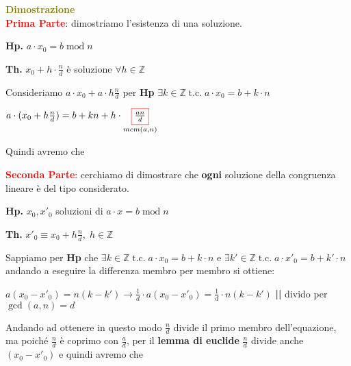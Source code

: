 \begin{boxA}
    \textcolor{olive}{\textbf{Dimostrazione}} \\
    \textcolor{red}{\textbf{Prima Parte}}: dimostriamo l'esistenza di una soluzione.

    {\centering
        \begin{minipage}[t]{0.45\textwidth}
            \centering
            \textbf{Hp.} $a \cdot x_0 = b \; \text{mod} \; n$
        \end{minipage}
        \begin{minipage}[t]{0.45\textwidth}
            \centering
            \textbf{Th.} $x_0 + h \cdot \frac{n}{d}$ è soluzione $\forall h \in \mathbb{Z}$
        \end{minipage}
    \par}
    Consideriamo $a \cdot x_0 + a \cdot h \frac{n}{d}$ per \textbf{Hp} $\exists k \in \mathbb{Z} \; \text{t.c.} \; a \cdot x_0 = b + k \cdot n$

    {\centering
    $a \cdot (x_0 + h \frac{n}{d}) = b + kn + h \cdot \underset{mcm(a, n)}{\fcolorbox{red}{white}{$\frac{an}{d}$}}$
    \par}
    Quindi avremo che 

    \textcolor{red}{\textbf{Seconda Parte}}: cerchiamo di dimostrare che \textbf{ogni} soluzione della congruenza lineare è del tipo considerato.

    {\centering
        \begin{minipage}[t]{0.45\textwidth}
            \centering
            \textbf{Hp.} $x_0, x'_0$ soluzioni di $a \cdot x = b \; \text{mod} \; n$
        \end{minipage}
        \begin{minipage}[t]{0.45\textwidth}
            \centering
            \textbf{Th.} $x'_0 \equiv x_0 + h \frac{n}{d}, \; h \in \mathbb{Z}$
        \end{minipage}
    \par}
    Sappiamo per \textbf{Hp} che $\exists k \in \mathbb{Z} \; \text{t.c.} \; a \cdot x_0 = b + k \cdot n$ e $\exists k' \in \mathbb{Z} \; \text{t.c.} \; a \cdot x'_0 = b + k' \cdot n$ andando a eseguire la differenza membro per membro si ottiene: 

    {\centering
        $a (x_0 - x'_0) = n (k - k') \rightarrow \frac{1}{d} \cdot a (x_0 - x'_0) = \frac{1}{d} \cdot n (k - k') $ \textbf{||} divido per $\gcd (a, n) = d$
    \par}
    Andando ad ottenere  in questo modo $\frac{n}{d}$ divide il primo membro dell'equazione, ma poiché $\frac{n}{d}$ è coprimo con $\frac{a}{d}$, per il \textbf{lemma di euclide} $\frac{n}{d}$ divide anche $(x_0 - x'_0)$ e quindi avremo che


\end{boxA}

